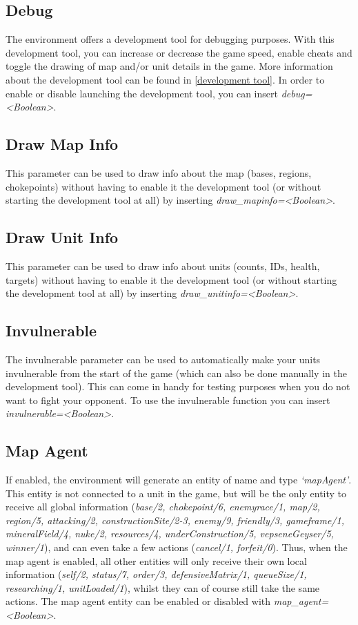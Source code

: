 \subsection{Debug}
\label{debug}
The environment offers a development tool for debugging purposes. With this development tool, you can increase or decrease the game speed, enable cheats and toggle the drawing of map and/or unit details in the game. More information about the development tool can be found in \ref{development tool}. In order to enable or disable launching the development tool, you can insert \textit{debug=<Boolean>}.

\subsection{Draw Map Info}
\label{draw map info}
This parameter can be used to draw info about the map (bases, regions, chokepoints) without having to enable it the development tool (or without starting the development tool at all) by inserting \textit{draw\_mapinfo=<Boolean>}.

\subsection{Draw Unit Info}
\label{draw unit info}
This parameter can be used to draw info about units (counts, IDs, health, targets) without having to enable it the development tool (or without starting the development tool at all) by inserting \textit{draw\_unitinfo=<Boolean>}.

\subsection{Invulnerable}
\label{invulnerable}
The invulnerable parameter can be used to automatically make your units invulnerable from the start of the game (which can also be done manually in the development tool). This can come in handy for testing purposes when you do not want to fight your opponent. To use the invulnerable function you can insert \textit{invulnerable=<Boolean>}.

\subsection{Map Agent}
\label{map agent}
If enabled, the environment will generate an entity of name and type \textit{`mapAgent'}. This entity is not connected to a unit in the game, but will be the only entity to receive all global information (\textit{base/2, chokepoint/6, enemyrace/1, map/2, region/5, attacking/2, constructionSite/2-3, enemy/9, friendly/3, gameframe/1, mineralField/4, nuke/2, resources/4, underConstruction/5, vepseneGeyser/5, winner/1}), and can even take a few actions (\textit{cancel/1, forfeit/0}). Thus, when the map agent is enabled, all other entities will only receive their own local information (\textit{self/2, status/7, order/3, defensiveMatrix/1, queueSize/1, researching/1, unitLoaded/1}), whilst they can of course still take the same actions. The map agent entity can be enabled or disabled with \textit{map\_agent=<Boolean>}.

